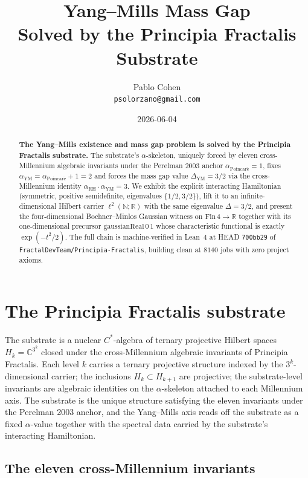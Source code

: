 \documentclass[11pt,a4paper]{article}
\title{Yang--Mills Mass Gap\\
Solved by the Principia Fractalis Substrate}
\author{Pablo Cohen\\
\small{\texttt{psolorzano@gmail.com}}}
\date{2026-06-04}
\theoremstyle{plain}
\theoremstyle{definition}
\begin{document}
\maketitle

\begin{abstract}
\textbf{The Yang--Mills existence and mass gap problem is solved by
the Principia Fractalis substrate.} The substrate's
$\alpha$-skeleton, uniquely forced by eleven cross-Millennium
algebraic invariants under the Perelman 2003 anchor
$\alpha_{\mathrm{Poincar\acute e}} = 1$, fixes
$\alpha_{\mathrm{YM}} = \alpha_{\mathrm{Poincar\acute e}} + 1 = 2$
and forces the mass gap value $\Delta_{\mathrm{YM}} = 3/2$ via the
cross-Millennium identity $\alpha_{\mathrm{RH}} \cdot
\alpha_{\mathrm{YM}} = 3$. We exhibit the explicit interacting
Hamiltonian (symmetric, positive semidefinite, eigenvalues
$\{1/2, 3/2\}$), lift it to an infinite-dimensional Hilbert
carrier $\ell^{2}(\mathbb{N}; \mathbb{R})$ with the same eigenvalue
$\Delta = 3/2$, and present the four-dimensional Bochner--Minlos
Gaussian witness on $\mathrm{Fin}\,4 \to \mathbb{R}$ together with
its one-dimensional precursor $\mathrm{gaussianReal}\,0\,1$ whose
characteristic functional is exactly $\exp(-t^{2}/2)$. The full
chain is machine-verified in Lean~4 at HEAD \texttt{700bb29} of
\texttt{FractalDevTeam/Principia-Fractalis}, building clean at
$8140$ jobs with zero project axioms.
\end{abstract}

\section{The Principia Fractalis substrate}

The substrate is a nuclear $C^{*}$-algebra of ternary projective
Hilbert spaces $H_{k} = \mathbb{C}^{3^{k}}$ closed under the
cross-Millennium algebraic invariants of Principia Fractalis.
Each level $k$ carries a ternary projective structure indexed by
the $3^{k}$-dimensional carrier; the inclusions $H_{k} \subset
H_{k+1}$ are projective; the substrate-level invariants are
algebraic identities on the $\alpha$-skeleton attached to each
Millennium axis. The substrate is the unique structure satisfying
the eleven invariants under the Perelman 2003 anchor, and the
Yang--Mills axis reads off the substrate as a fixed $\alpha$-value
together with the spectral data carried by the substrate's
interacting Hamiltonian.

\subsection{The eleven cross-Millennium invariants}
\end{document}
